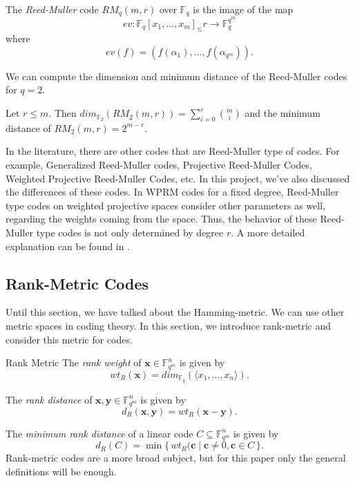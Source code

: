 \begin{definition}
The \textit{Reed-Muller} code $RM_q(m, r)$ over $\mathbb{F}_q$ is the image of the map
\[
ev:\mathbb{F}_q[x_1, \dots, x_m]_\leq r \xrightarrow{} \mathbb{F}_q^{q^m}
\]
where
\[
ev(f) = (f(\alpha_1), \dots, f(\alpha_{q^m})).
\]
\end{definition}

We can compute the dimension and minimum distance of the Reed-Muller codes for $q = 2$.

\begin{proposition}
Let $r \leq m$. Then $dim_{\mathbb{F}_2}(RM_2(m, r)) = 
\sum_{i=0}^r {m\choose i}$ and the minimum distance of $RM_2(m, r) = 2^{m-r}$.
\end{proposition}

In the literature, there are other codes that are Reed-Muller type of codes. For example, Generalized Reed-Muller codes, Projective Reed-Muller Codes, Weighted Projective Reed-Muller Codes, etc. In this project, we've also discussed the differences of these codes. In WPRM codes for a fixed degree, Reed-Muller type codes on weighted projective spaces consider other parameters as well, regarding the weights coming from the space. Thus, the behavior of these Reed-Muller type codes is not only determined by degree $r$. A more detailed explanation can be found in \cite{WPS2023, WPS2025, Proj}.

\subsection{Rank-Metric Codes}

Until this section, we have talked about the Hamming-metric. We can use other metric spaces in coding theory. In this section, we introduce rank-metric and consider this metric for codes.

\begin{definition}{Rank Metric}
The \textit{rank weight} of $\mathbf{x}\in \mathbb{F}_{q^m}^n$ is given by
\[
wt_R(\mathbf{x}) = dim_{\mathbb{F}_q}(\langle x_1,\dots,x_n\rangle).
\]

The \textit{rank distance} of $\mathbf{x},\mathbf{y}\in \mathbb{F}_{q^m}^n$ is given by
\[
d_R(\mathbf{x},\mathbf{y})=wt_R(\mathbf{x}-\mathbf{y}).
\]

The \textit{minimum rank distance} of a linear code $C\subseteq \mathbb{F}_{q^m}^n$ is given by
\[
d_R(C)=\min\{\,wt_R(\mathbf{c}\mid\mathbf{c}\neq0, \mathbf{c}\in C\,\}.
\]
Rank-metric codes are a more broad subject, but for this paper only the general definitions will be enough.    
\end{definition}

